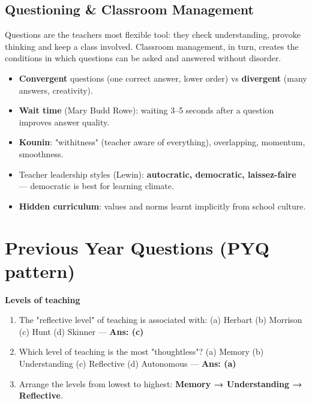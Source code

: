 

\needspace{125pt}

\hypertarget{p1-01--74-questioning--classroom-management}{%
\subsection{Questioning \& Classroom Management}\label{p1-01--74-questioning--classroom-management}}

Questions are the teacher\textquotesingle s most flexible tool: they check understanding, provoke thinking and keep a
class involved. Classroom management, in turn, creates the conditions in which questions can be asked and
answered without disorder.

\begin{itemize}
\tightlist
\item
  \textbf{Convergent} questions (one correct answer, lower order) vs \textbf{divergent} (many answers, creativity).
\item
  \textbf{Wait time} (Mary Budd Rowe): waiting 3--5 seconds after a question improves answer quality.
\item
  \textbf{Kounin}: "withitness" (teacher aware of everything), overlapping, momentum, smoothness.
\item
  Teacher leadership styles (Lewin): \textbf{autocratic, democratic, laissez-faire} --- democratic is best for learning climate.
\item
  \textbf{Hidden curriculum}: values and norms learnt implicitly from school culture.
\end{itemize}

\needspace{125pt}

\hypertarget{p1-01--previous-year-questions-pyq-pattern}{%
\section{Previous Year Questions (PYQ pattern)}\label{p1-01--previous-year-questions-pyq-pattern}}

\textbf{Levels of teaching}

\begin{enumerate}
\def\labelenumi{\arabic{enumi}.}
\tightlist
\item
  The "reflective level" of teaching is associated with: (a) Herbart (b) Morrison (c) Hunt (d) Skinner --- \textbf{Ans: (c)}
\item
  Which level of teaching is the most "thoughtless"? (a) Memory (b) Understanding (c) Reflective (d) Autonomous --- \textbf{Ans: (a)}
\item
  Arrange the levels from lowest to highest: \textbf{Memory → Understanding → Reflective}.
\end{enumerate}

